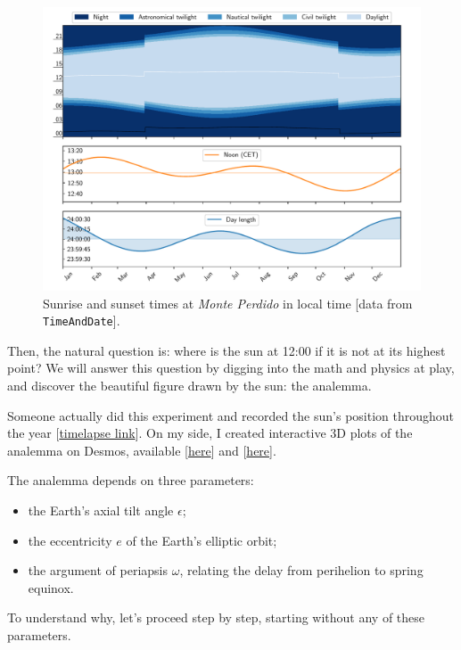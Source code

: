 \documentclass[12pt]{article}
\begin{document}
\begin{figure}[ht]
    \centering
    \includegraphics[width=\textwidth]{./sun_graph.pdf}
    \caption{
        Sunrise and sunset times at \textit{Monte Perdido} in local 
        time [data from \texttt{TimeAndDate}].
    }
    \label{fig:sunrise_sunset}
\end{figure}

Then, the natural question is: where is the sun at 12:00 if it is not at its 
highest point? We will answer this question by digging into the math and physics
at play, and discover the beautiful figure drawn by the sun: the analemma.

Someone actually did this experiment and recorded the sun's position
throughout the year 
[\href{https://www.youtube.com/watch?v=Deli5COMJhs}{timelapse link}].
On my side, I created interactive 3D plots of the analemma on Desmos, available
[\href{https://www.desmos.com/3d/1zuaedwwnz}{here}] and 
[\href{https://www.desmos.com/3d/dktrfjpwnh}{here}].


\newpage
The analemma depends on three parameters:
\begin{itemize}
    \item the Earth's axial tilt angle $\epsilon$;
    \item the eccentricity $e$ of the Earth's elliptic orbit;
    \item the argument of periapsis $\omega$, relating the delay 
    from perihelion to spring equinox.
\end{itemize}
To understand why, let's proceed step by step, starting without any of these
parameters.
\end{document}
